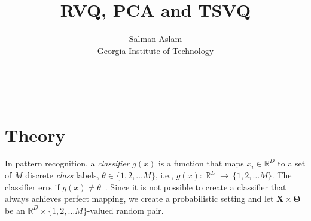 
\title{RVQ, PCA and TSVQ}
\author{Salman Aslam\\ Georgia Institute of Technology}
\date{}


\maketitle
\rule[0pt]{\textwidth}{1pt}
\tableofcontents
\rule[0pt]{\textwidth}{1pt}


\section{Theory}
In pattern recognition, a \emph{classifier} $g(x)$ is a function that maps $x_i \in \mathbb{R}^D$ to a set of $M$ discrete \emph{class} labels, $\theta  \in \{1, 2, \ldots M\}$, i.e., $g(x):~\mathbb{R}^D~\rightarrow~\{1, 2, \ldots M\}$.  The classifier errs if $g(x) \neq \theta$~\cite{1996_BOOK_PR_DevroyeGyorfiLugosi}.  Since it is not possible to create a classifier that always achieves perfect mapping, we create a probabilistic setting and let $\mathbf{X} \times \mathbf{\Theta}$ be an $\mathbb{R}^D \times \{1, 2, \ldots M\}$-valued random pair.  

